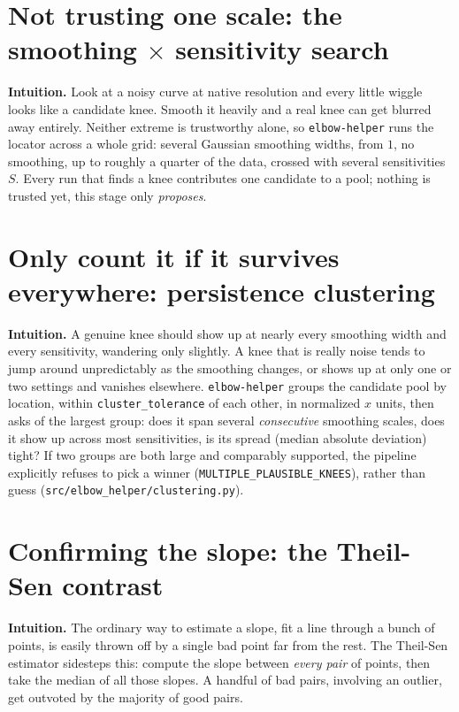 \documentclass[11pt]{article}
\newcommand{\code}[1]{\texttt{#1}}
\begin{document}
\section{Not trusting one scale: the smoothing $\times$ sensitivity search}
\label{sec:multiscale}

\textbf{Intuition.} Look at a noisy curve at native resolution and every
little wiggle looks like a candidate knee. Smooth it heavily and a real
knee can get blurred away entirely. Neither extreme is trustworthy alone,
so \code{elbow-helper} runs the locator across a whole grid: several Gaussian
smoothing widths, from $1$, no smoothing, up to roughly a quarter of the
data, crossed with several sensitivities $S$. Every run that finds a knee
contributes one candidate to a pool; nothing is trusted yet, this stage
only \emph{proposes}.

\section{Only count it if it survives everywhere: persistence clustering}

\textbf{Intuition.} A genuine knee should show up at nearly every smoothing
width and every sensitivity, wandering only slightly. A knee that is really
noise tends to jump around unpredictably as the smoothing changes, or shows
up at only one or two settings and vanishes elsewhere. \code{elbow-helper}
groups the candidate pool by location, within \code{cluster\_tolerance} of
each other, in normalized $x$ units, then asks of the largest group: does
it span several \emph{consecutive} smoothing scales, does it show up
across most sensitivities, is its spread (median absolute deviation)
tight? If two groups are both large and comparably supported, the pipeline
explicitly refuses to pick a winner (\code{MULTIPLE\_PLAUSIBLE\_KNEES}),
rather than guess (\code{src/elbow\_helper/\allowbreak clustering.py}).

\section{Confirming the slope: the Theil-Sen contrast}

\textbf{Intuition.} The ordinary way to estimate a slope, fit a line
through a bunch of points, is easily thrown off by a single bad point far
from the rest. The Theil-Sen estimator sidesteps this: compute the slope
between \emph{every pair} of points, then take the median of all those
slopes. A handful of bad pairs, involving an outlier, get outvoted by the
majority of good pairs.
\end{document}
